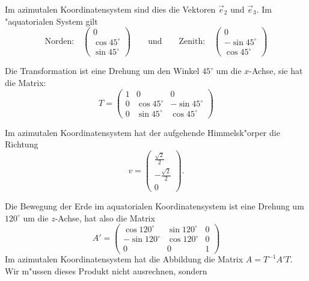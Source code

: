 \begin{loesung}
\begin{teilaufgaben}
\item Im azimutalen Koordinatensystem sind dies die Vektoren $\vec e_2$
und $\vec e_3$. Im "aquatorialen System gilt
\[
\text{Norden:} \quad \begin{pmatrix}0\\ \cos 45^\circ\\\sin 45^\circ\end{pmatrix}
\qquad\text{und}\qquad
\text{Zenith:} \quad \begin{pmatrix}0\\-\sin 45^\circ\\\cos 45^\circ\end{pmatrix}
\]

\item Die Transformation ist eine Drehung um den Winkel $45^\circ$
um die $x$-Achse, sie hat die Matrix:
\[
T=\begin{pmatrix}
1& 0            & 0            \\
0& \cos 45^\circ&-\sin 45^\circ\\
0& \sin 45^\circ& \cos 45^\circ
\end{pmatrix}
\]
\item Im azimutalen Koordinatensystem hat der aufgehende Himmelsk"orper
die Richtung
\[
v=\begin{pmatrix}
\frac{\sqrt{2}}2\\-\frac{\sqrt{2}}2\\0
\end{pmatrix}.
\]
\item
Die Bewegung der Erde im aquatorialen Koordinatensystem ist eine Drehung
um $ 120^\circ$ um die $z$-Achse, hat also die Matrix
\[
A'=\begin{pmatrix}
 \cos 120^\circ & \sin 120^\circ & 0\\
-\sin 120^\circ & \cos 120^\circ & 0\\
 0              & 0              & 1
\end{pmatrix}
\]
Im azimutalen Koordinatensystem hat die Abbildung die Matrix
$A=T^{-1}A'T.$ Wir m"ussen dieses Produkt nicht ausrechnen, sondern

\end{teilaufgaben}
\end{loesung}
